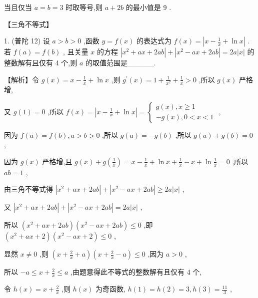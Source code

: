 \documentclass[10pt]{article}
\begin{document}
当且仅当 \(a = b = 3\) 时取等号,则 \(a + {2b}\) 的最小值是 9 .

【三角不等式】

1. (普陀 12) 设 \(a > b > 0\) ,函数 \(y = f\left( x\right)\) 的表达式为 \(f\left( x\right)  = \left| {x - \frac{1}{x} + \ln x}\right|\) . 若 \(f\left( a\right)  = f\left( b\right)\) , 且关量 \(x\) 的方程 \(\left| {{x}^{2} + {ax} + {2ab}}\right|  + \left| {{x}^{2} - {ax} + {2ab}}\right|  = {2a}\left| x\right|\) 的整数解有且仅有 4 个,则 \(a\) 的取值范围是\_\_\_\_\_.

【解析】令 \(g\left( x\right)  = x - \frac{1}{x} + \ln x\) ,则 \({g}^{\prime }\left( x\right)  = 1 + \frac{1}{{x}^{2}} + \frac{1}{x} > 0\) ,所以 \(g\left( x\right)\) 严格增,

又 \(g\left( 1\right)  = 0\) ,所以 \(f\left( x\right)  = \left| {x - \frac{1}{x} + \ln x}\right|  = \left\{  \begin{array}{l} g\left( x\right) ,x \geq  1 \\   - g\left( x\right) ,0 < x < 1 \end{array}\right.\) ,

因为 \(f\left( a\right)  = f\left( b\right) ,a > b > 0\) ,所以 \(g\left( a\right)  =  - g\left( b\right)\) ,所以 \(g\left( a\right)  + g\left( b\right)  = 0\) ,

因为 \(g\left( x\right)\) 严格增,且 \(g\left( x\right)  + g\left( \frac{1}{x}\right)  = x - \frac{1}{x} + \ln x + \frac{1}{x} - x + \ln \frac{1}{x} = 0\) ,所以 \({ab} = 1\) ,

由三角不等式得 \(\left| {{x}^{2} + {ax} + {2ab}}\right|  + \left| {{x}^{2} - {ax} + {2ab}}\right|  \geq  {2a}\left| x\right|\) ,

又 \(\left| {{x}^{2} + {ax} + {2ab}}\right|  + \left| {{x}^{2} - {ax} + {2ab}}\right|  = {2a}\left| x\right|\) ,

所以 \(\left( {{x}^{2} + {ax} + {2ab}}\right) \left( {{x}^{2} - {ax} + {2ab}}\right)  \leq  0\) ,即 \(\left( {{x}^{2} + {ax} + 2}\right) \left( {{x}^{2} - {ax} + 2}\right)  \leq  0\) ,

显然 \(x \neq  0\) ,则 \(\left( {x + \frac{2}{x} + a}\right) \left( {x + \frac{2}{x} - a}\right)  \leq  0\) ,因为 \(a > 0\) ,

所以 \(- a \leq  x + \frac{2}{x} \leq  a\) ,由题意得此不等式的整数解有且仅有 4 个,

令 \(h\left( x\right)  = x + \frac{2}{x}\) ,则 \(h\left( x\right)\) 为奇函数, \(h\left( 1\right)  = h\left( 2\right)  = 3,h\left( 3\right)  = \frac{11}{3}\) ,
\end{document}
